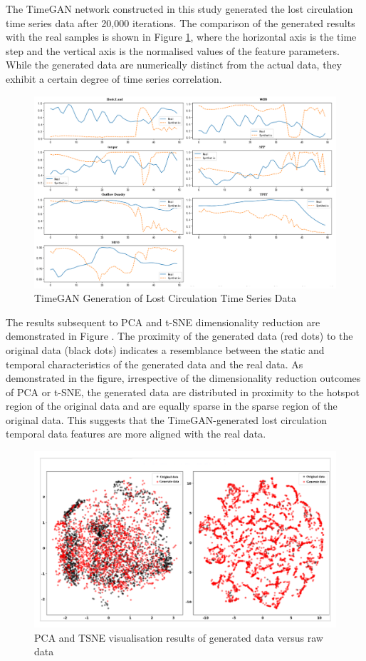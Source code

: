 \documentclass[journal,article,submit,pdftex,moreauthors]{Definitions/mdpi}
\begin{document}
The TimeGAN network constructed in this study generated the lost circulation time series data after 20,000 iterations. The comparison of the generated results with the real samples is shown in Figure   \ref{fig:TimeGAN Generation of Lost Circulation Time Series Data}, where the horizontal axis is the time step and the vertical axis is the normalised values of the feature parameters. While the generated data are numerically distinct from the actual data, they exhibit a certain degree of time series correlation. 

\begin{figure}[h]
    \centering
    \includegraphics[width=0.75\linewidth]{图片/timeGan数据生成.png}
    \caption{TimeGAN Generation of Lost Circulation Time Series Data}
    \label{fig:TimeGAN Generation of Lost Circulation Time Series Data}
\end{figure}


The results subsequent to PCA and t-SNE dimensionality reduction are demonstrated in Figure \label{fig:PCA and TSNE visualisation results of generated data versus raw data}. The proximity of the generated data (red dots) to the original data (black dots) indicates a resemblance between the static and temporal characteristics of the generated data and the real data. As demonstrated in the figure, irrespective of the dimensionality reduction outcomes of PCA or t-SNE, the generated data are distributed in proximity to the hotspot region of the original data and are equally sparse in the sparse region of the original data. This suggests that the TimeGAN-generated lost circulation temporal data features are more aligned with the real data.

\begin{figure}[h]
    \centering
    \includegraphics[width=0.75\linewidth]{图片/pca tsne.png}
    \caption{PCA and TSNE visualisation results of generated data versus raw data}
    \label{fig:PCA and TSNE visualisation results of generated data versus raw data}
\end{figure}
\end{document}
